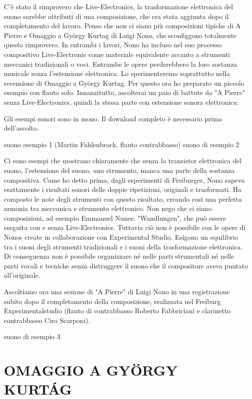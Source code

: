 C'è stato il rimprovero che Live-Electronics, la trasformazione elettronica del suono sarebbe attributi di una composizione, che era stata aggiunta dopo il completamento del lavoro. Penso che non ci siano più composizioni tipiche di A Pierre e Omaggio a György Kurtag di Luigi Nono, che sconfiggono totalmente questo rimprovero. In entrambi i lavori, Nono ha incluso nel suo processo compositivo Live-Electronic come materiale equivalente accanto a strumenti meccanici tradizionali o voci. Entrambe le opere perderebbero la loro sostanza musicale senza l'estensione elettronica.
Lo sperimenteremo soprattutto nella recensione di Omaggio a György Kurtag. Per questo ora ho preparato un piccolo esempio con flauto solo. Innanzitutto, ascolterai un paio di battute da "A Pierre" senza Live-Electronics, quindi la stessa parte con estensione sonora elettronica:

Gli esempi sonori sono in mono. Il download completo è necessario prima dell'ascolto.

suono esempio 1 (Martin Fahlenbrock, flauto contrabbasso)
suono di esempio 2

Ci sono esempi che mostrano chiaramente che senza la transistor elettronica del suono, l'estensione del suono, uno strumento, manca una parte della sostanza compositiva. Come ho detto prima, dagli esperimenti di Freiburger, Nono sapeva esattamente i risultati sonori delle doppie ripetizioni, originali e trasformati. Ha composto le note degli strumenti con questo risultato, creando così una perfetta armonia tra meccanica e strumento elettronico. Non nego che ci siano composizioni, ad esempio Emmanuel Nunes: "Wandlungen", che può essere eseguita con e senza Live-Electronics. Tuttavia ciò non è possibile con le opere di Nonos create in collaborazione con Experimental Studio. Esigono un equilibrio tra i suoni degli strumenti tradizionali e i suoni della trasformazione elettronica. Di conseguenza non è possibile organizzare né nelle parti strumentali né nelle parti vocali e tecniche senza distruggere il suono che il compositore aveva puntato all'originale.

Ascoltiamo ora una sezione di "A Pierre" di Luigi Nono in una registrazione subito dopo il completamento della composizione, realizzata nel Freiburg Experimentalstudio (flauto di contrabbasso Roberto Fabbriciani e clarinetto contrabbasso Ciro Scarponi).

suono di esempio 3

\section{OMAGGIO A GYÖRGY KURTÁG}

